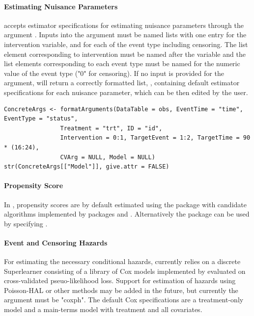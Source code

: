 \documentclass{report}
\newcommand{\1}{\ensuremath{\mathbf{1}}}
\begin{document}
\paragraph{Estimating Nuisance Parameters}
\label{NuisanceEstimation}
 accepts estimator specifications for estimating nuisance parameters through the argument . Inputs into the  argument must be named lists with one entry for the intervention variable, and for each of the event type including censoring. The list element corresponding to intervention must be named after the variable and the list elements corresponding to each event type must be named for the numeric value of the event type ("0" for censoring). If no input is provided for the  argument,  will return a correctly formatted list, , containing default estimator specifications for each nuisance parameter, which can be then edited by the user.

\begin{lstlisting}
ConcreteArgs <- formatArguments(DataTable = obs, EventTime = "time", EventType = "status", 
				Treatment = "trt", ID = "id", 
				Intervention = 0:1, TargetEvent = 1:2, TargetTime = 90 * (16:24), 
				CVArg = NULL, Model = NULL)
str(ConcreteArgs[["Model"]], give.attr = FALSE)
\end{lstlisting}

\paragraph{Propensity Score}
\label{PropScore}
In , propensity scores are by default estimated using the 
package  with candidate algorithms  implemented by packages  and . Alternatively the  package can be used by specifying .

\paragraph{Event and Censoring Hazards}
\label{HazardEstimation}
For estimating the necessary conditional hazards,  currently relies on a discrete Superlearner consisting of a library of Cox models implemented by  evaluated on cross-validated pseuo-likelihood loss. Support for estimation of hazards using Poisson-HAL or other methods may be added in the future, but currently the  argument must be "coxph". The default Cox specifications are a treatment-only model and a main-terms model with treatment and all covariates.  
\end{document}
